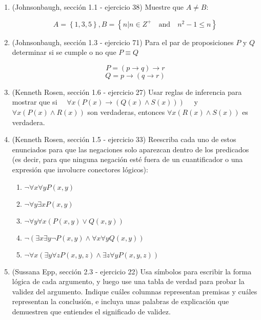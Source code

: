 \documentclass[10pt]{report}
\begin{document}
\begin{enumerate}
	\item (Johnsonbaugh, secci\'{o}n 1.1 - ejercicio 38) Muestre que $A \neq B$:
	
	\[ A= \left\{ 1,3,5 \right\}, B = \left\{ n|n \in Z^{+} \quad \textrm{and} \quad n^{2}-1 \leq n \right\}\]
	
	\item (Johnsonbaugh, secci\'{o}n 1.3 - ejercicio 71) Para el par de proposiciones $P$ y $Q$ determinar si se cumple o no que $P \equiv Q$
	
	\[ P= (p \rightarrow q) \rightarrow r\]
	\[ Q= p \rightarrow (q \rightarrow r)\]
	
	\item (Kenneth Rosen, secci\'{o}n 1.6 - ejercicio 27) Usar reglas de inferencia para mostrar que si $\quad \forall x( P(x) \rightarrow (Q(x) \land S(x))) \quad$ y $\forall x(P(x) \land R(x))$ son verdaderas, entonces $\forall x(R(x) \land S(x))$ es verdadera.
	
	\item (Kenneth Rosen, secci\'{o}n 1.5 - ejercicio 33) Reescriba cada uno de estos enunciados para que las negaciones solo aparezcan dentro de los predicados (es decir, para que ninguna negación esté fuera de un cuantificador o una expresión que involucre conectores lógicos):
	
	    \begin{enumerate}
	    
	        \item $\neg \forall x \forall y P(x,y)$
	        \item $\neg \forall y \exists x P(x,y)$
	        \item $\neg \forall y \forall x (P(x,y) \lor Q(x,y))$
	        \item $\neg (\exists x \exists y \neg P(x,y) \land \forall x \forall y Q(x,y))$
	        \item $\neg \forall x(\exists y \forall z P(x,y,z) \land \exists z \forall y P(x,y,z))$
	        
        \end{enumerate}
	
	\item (Sussana Epp, secci\'{o}n 2.3 - ejercicio 22) Usa símbolos para escribir la forma lógica de cada argumento, y luego use una tabla de verdad para probar la validez del argumento. Indique cuáles columnas representan premisas y cuáles representan la conclusión, e incluya unas palabras de explicación que demuestren que entiendes el significado de validez.
	

\end{enumerate}
\end{document}
